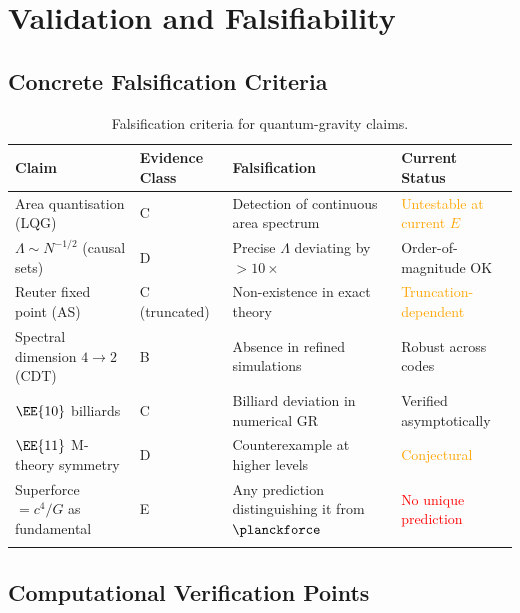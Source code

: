 \section{Validation and Falsifiability}
\label{sec:qg_validation}

\subsection{Concrete Falsification Criteria}

\begin{longtable}{p{3.5cm}p{2.5cm}p{3cm}p{3.5cm}}
\toprule
\textbf{Claim} & \textbf{Evidence Class} & \textbf{Falsification} &
\textbf{Current Status} \\
\midrule
\endhead
Area quantisation (LQG) &
    C &
    Detection of continuous area spectrum &
    \textcolor{orange}{Untestable at current $E$} \\
$\Lambda \sim N^{-1/2}$ (causal sets) &
    D &
    Precise $\Lambda$ deviating by $> 10\times$ &
    \textcolor{validcolor}{Order-of-magnitude OK} \\
Reuter fixed point (AS) &
    C (truncated) &
    Non-existence in exact theory &
    \textcolor{orange}{Truncation-dependent} \\
Spectral dimension $4 \to 2$ (CDT) &
    B &
    Absence in refined simulations &
    \textcolor{validcolor}{Robust across codes} \\
$\EE{10}$ billiards &
    C &
    Billiard deviation in numerical GR &
    \textcolor{validcolor}{Verified asymptotically} \\
$\EE{11}$ M-theory symmetry &
    D &
    Counterexample at higher levels &
    \textcolor{orange}{Conjectural} \\
Superforce $= c^4/G$ as fundamental &
    E &
    Any prediction distinguishing it from $\planckforce$ &
    \textcolor{red}{No unique prediction} \\
\bottomrule
\caption{Falsification criteria for quantum-gravity claims.}
\label{tab:qg_falsification}
\end{longtable}

\subsection{Computational Verification Points}

